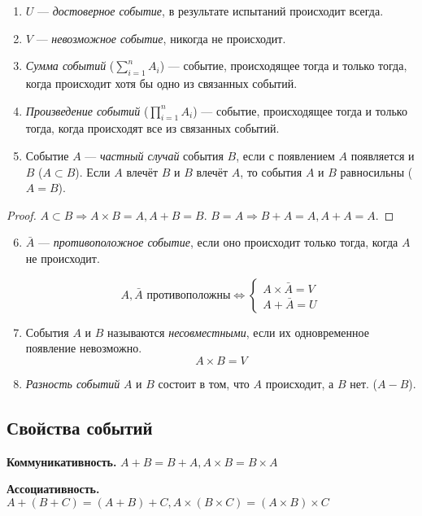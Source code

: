 \begin{enumerate}
	\item $U$ --- \textit{достоверное событие}, в результате испытаний происходит всегда.
	\item $V$ --- \textit{невозможное событие}, никогда не происходит.
	\item \textit{Сумма событий} ($\sum\limits_{i=1}^n A_i$) --- событие, происходящее тогда и только тогда, когда происходит хотя бы одно из связанных событий.
	\item \textit{Произведение событий} ($\prod\limits_{i=1}^n A_i$) --- событие, происходящее тогда и только тогда, когда происходят все из связанных событий.
	\item Событие $A$ --- \textit{частный случай} события $B$, если с появлением $A$ появляется и $B$ ($A \subset B$). Если $A$ влечёт $B$ и $B$ влечёт $A$, то события $A$ и $B$ равносильны ($A = B$).
\end{enumerate}
\begin{proof}
	$A \subset B \Rightarrow A\times B = A, A + B = B.$
	$B = A \Rightarrow B + A = A, A + A = A.$
\end{proof}
\begin{enumerate}
	\setcounter{enumi}{5}
	\item $\bar{A}$ --- \textit{противоположное событие}, если оно происходит только тогда, когда $A$ не происходит.

	      \[
		      A  ,  \bar{A} \text{ противоположны} \Leftrightarrow
		      \begin{cases}
			      A\times \bar{A} = V \\
			      A + \bar{A} = U
		      \end{cases}
	      \]

	\item События $A$ и $B$ называются \textit{несовместными}, если их одновременное появление невозможно.
	      $$A\times B = V$$

	\item \textit{Разность событий} $A$ и $B$ состоит в том, что $A$ происходит, а $B$ нет. ($A - B$).
\end{enumerate}

\subsection{Свойства событий}
\textbf{Коммуникативность.} $A + B = B + A, A\times B = B\times A$
\smallskip

\textbf{Ассоциативность.} $A + (B + C)=(A + B) + C, A\times (B\times C) = (A\times B)\times C$
\smallskip

